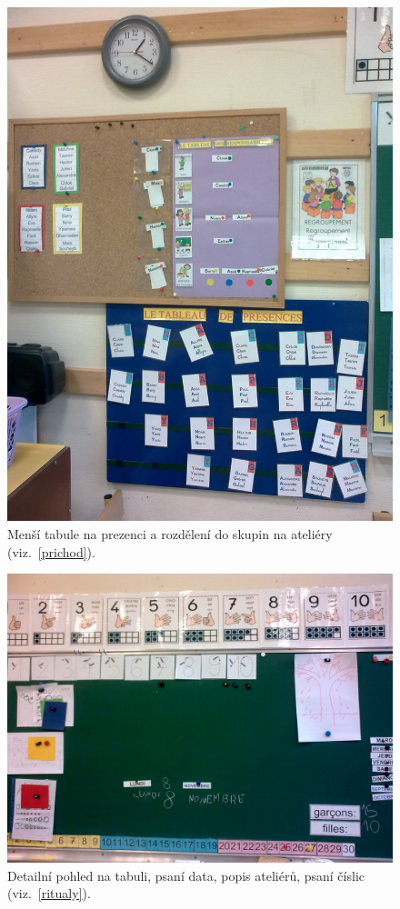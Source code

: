 	\begin{figure}[tb]
		\centering
		\includegraphics[height=0.35\textheight]{./fotky/Obr10.jpg}
		\caption{
			Menší tabule na prezenci a rozdělení do skupin na ateliéry (viz.~\ref{prichod}).
		}
		\label{Obr10}
	\end{figure}

	\begin{figure}[tb]
		\centering
		\includegraphics[height=0.35\textheight]{./fotky/Obr11.jpg}
		\caption{
			Detailní pohled na tabuli, psaní data, popis ateliérů, psaní číslic (viz.~\ref{ritualy}).
		}
		\label{Obr11}
	\end{figure}

